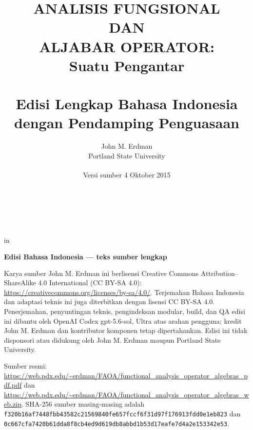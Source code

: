 \documentclass[11pt,reqno]{amsbook}
\theoremstyle{definition}
\theoremstyle{remark}
\numberwithin{equation}{section}
\begin{document}
 \frontmatter
 \title{ANALISIS FUNGSIONAL \\ DAN \\ ALJABAR OPERATOR: \\ Suatu Pengantar \\ \mbox{} \\ \large Edisi Lengkap Bahasa Indonesia dengan Pendamping Penguasaan}
 \author{John M. Erdman \\
      Portland State University \\
      \mbox{\hphantom{P}} \\
      Versi sumber 4 Oktober 2015 \\
      \mbox{\hphantom{P}} \\
      \mbox{\hphantom{P}} \\
            \mbox{\hphantom{P}} \\
                  \mbox{\hphantom{P}} }


 in


\maketitle


\begin{center}
\textbf{Edisi Bahasa Indonesia --- teks sumber lengkap}
\end{center}

Karya sumber John M. Erdman ini berlisensi Creative Commons
Attribution--ShareAlike 4.0 International (CC BY-SA 4.0):
\url{https://creativecommons.org/licenses/by-sa/4.0/}.
Terjemahan Bahasa Indonesia dan adaptasi teknis ini juga diterbitkan dengan
lisensi CC BY-SA 4.0. Penerjemahan, penyuntingan teknis, pengindeksan modular,
build, dan QA edisi ini dibantu oleh OpenAI Codex gpt-5.6-sol, Ultra atas arahan
pengguna; kredit John M. Erdman dan kontributor komponen tetap dipertahankan.
Edisi ini tidak
disponsori atau didukung oleh John M. Erdman maupun Portland State University.

\begin{sloppypar}
Sumber resmi:
\url{https://web.pdx.edu/~erdman/FAOA/functional_analysis_operator_algebras_pdf.pdf}
dan
\url{https://web.pdx.edu/~erdman/FAOA/functional_analysis_operator_algebras_web.zip}.
SHA-256 sumber masing-masing adalah
\texttt{f320b16af7448fbb43582c21569840fe\allowbreak657fccf6f31d97f176913fdd0e1eb823}
dan
\texttt{0c667cfa7420b61dda8f8cb4ed9d619d\allowbreak b8abbd1b53d17eafe7d4a2e153342e53}.
\end{sloppypar}
\end{document}
